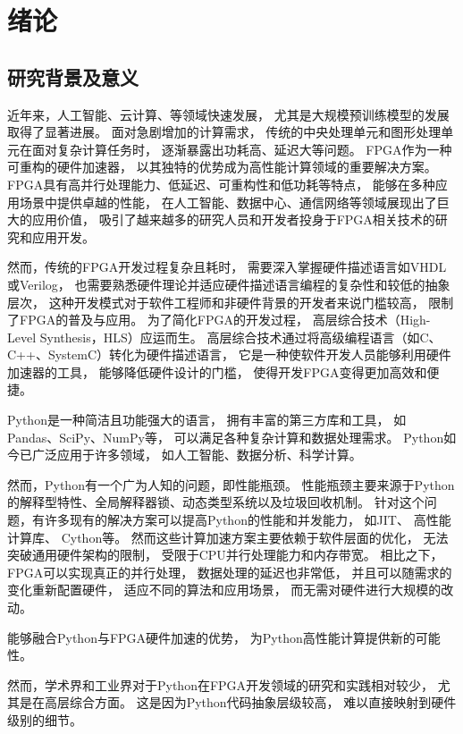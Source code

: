 \section{绪论}

\subsection{研究背景及意义}

近年来，人工智能、云计算、等领域快速发展，
尤其是大规模预训练模型的发展取得了显著进展。
面对急剧增加的计算需求，
传统的中央处理单元和图形处理单元在面对复杂计算任务时，
逐渐暴露出功耗高、延迟大等问题。
FPGA作为一种可重构的硬件加速器，
以其独特的优势成为高性能计算领域的重要解决方案。
FPGA具有高并行处理能力、低延迟、可重构性和低功耗等特点，
能够在多种应用场景中提供卓越的性能，
在人工智能\cite{zeng2024flightllm}、数据中心、通信网络等领域展现出了巨大的应用价值，
吸引了越来越多的研究人员和开发者投身于FPGA相关技术的研究和应用开发。

然而，传统的FPGA开发过程复杂且耗时，
需要深入掌握硬件描述语言如VHDL或Verilog，
也需要熟悉硬件理论并适应硬件描述语言编程的复杂性和较低的抽象层次，
这种开发模式对于软件工程师和非硬件背景的开发者来说门槛较高，
限制了FPGA的普及与应用。
为了简化FPGA的开发过程，
高层综合技术（High-Level Synthesis，HLS）\cite{hls}应运而生。
高层综合技术通过将高级编程语言（如C、C++、SystemC）转化为硬件描述语言，
它是一种使软件开发人员能够利用硬件加速器的工具，
能够降低硬件设计的门槛，
使得开发FPGA变得更加高效和便捷。

Python是一种简洁且功能强大的语言，
拥有丰富的第三方库和工具，
如Pandas、SciPy、NumPy等，
可以满足各种复杂计算和数据处理需求。
Python如今已广泛应用于许多领域，
如人工智能、数据分析、科学计算。

然而，Python有一个广为人知的问题，即性能瓶颈。
性能瓶颈主要来源于Python的解释型特性、全局解释器锁、动态类型系统以及垃圾回收机制。
针对这个问题，有许多现有的解决方案可以提高Python的性能和并发能力，
如JIT\cite{rpython}\cite{pypy1}\cite{izawa2022threaded}\cite{pypy2}、
高性能计算库\cite{harris2020array}、
Cython\cite{cython}等。
然而这些计算加速方案主要依赖于软件层面的优化，
无法突破通用硬件架构的限制，
受限于CPU并行处理能力和内存带宽。
相比之下，FPGA可以实现真正的并行处理，
数据处理的延迟也非常低，
并且可以随需求的变化重新配置硬件，
适应不同的算法和应用场景，
而无需对硬件进行大规模的改动。

能够融合Python与FPGA硬件加速的优势，
为Python高性能计算提供新的可能性。

然而，学术界和工业界对于Python在FPGA开发领域的研究和实践相对较少，
尤其是在高层综合方面。
这是因为Python代码抽象层级较高，
难以直接映射到硬件级别的细节。

